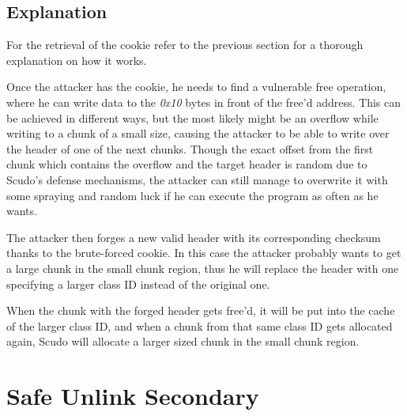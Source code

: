 \documentclass[a4paper,11pt,oneside]{report}
\begin{document}
\subsection{Explanation}

For the retrieval of the cookie refer to the previous section for a thorough explanation
on how it works.

Once the attacker has the cookie, he needs to find a vulnerable free operation, where he
can write data to the \emph{0x10} bytes in front of the free'd address. 
This can be
achieved in different ways, but the most likely might be an overflow while writing to a
chunk of a small size, causing the attacker to be able to write over the header of one of
the next chunks. 
Though the exact offset from the first chunk which contains the overflow
and the target header is random due to Scudo's defense mechanisms, the attacker can still
manage to overwrite it with some spraying and random luck if he can execute the program as
often as he wants.

The attacker then forges a new valid header with its corresponding checksum thanks to
the brute-forced cookie. 
In this case the attacker probably wants to get a large chunk in
the small chunk region, thus he will replace the header with one specifying a larger class
ID instead of the original one.

When the chunk with the forged header gets free'd, it will be put into the cache of the
larger class ID, and when a chunk from that same class ID gets allocated again, Scudo will
allocate a larger sized chunk in the small chunk region.


\section{Safe Unlink Secondary}


\end{document}
